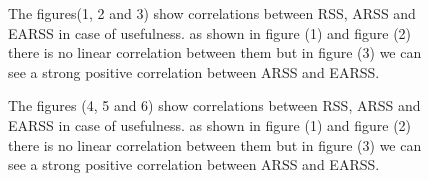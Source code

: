 \documentclass[letterpaper, 10 pt, conference]{ieeeconf}
\begin{document}
\begin{figure}[h!]
The figures(1, 2 and 3) show correlations between RSS, ARSS and EARSS in case of usefulness. as shown in figure (1) and figure (2) there is no linear correlation between them but in figure (3) we can see a strong positive correlation between ARSS and EARSS. 
\end{figure}
\begin{figure}[h!]
The figures (4, 5 and 6) show correlations between RSS, ARSS and EARSS in case of usefulness. as shown in figure (1) and figure (2) there is no linear correlation between them but in figure (3) we can see a strong positive correlation between ARSS and EARSS. 
\end{figure}


\begin{figure}[h!]
\captionsetup[subfigure]{labelformat=empty}
\hfill
{}\hfill

\end{figure}
\end{document}
